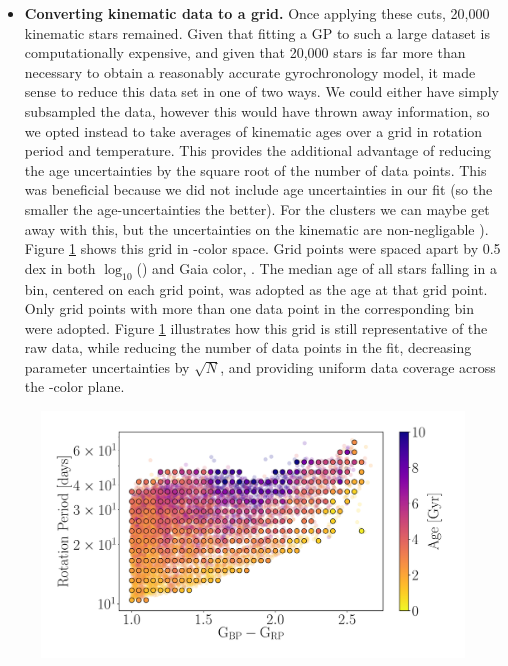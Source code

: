 \begin{itemize}
\item {\bf Converting kinematic data to a grid.}
Once applying these cuts, 20,000 kinematic stars remained.
        Given that fitting a GP to such a large dataset is computationally
        expensive, and given that 20,000 stars is far more than necessary to
        obtain a reasonably accurate gyrochronology model, it made sense to
        reduce this data set in one of two ways.
        We could either have simply subsampled the data, however this would
        have thrown away
        information, so we opted instead to take averages of kinematic ages
        over a grid in rotation period and temperature.
This provides the additional advantage of reducing the age uncertainties by
        the square root of the number of data points.
        This was beneficial because we did not include age uncertainties in
        our fit (so the smaller the age-uncertainties the better).
For the clusters we can maybe get away with this, but the uncertainties on the
kinematic are non-negligable \citep[likely 1-2 Gyr][]{lu2021}).
Figure \ref{fig:grid_points} shows this grid in \prot-color space.
        Grid points were spaced apart by 0.5 dex in both $\log_{10}$(\prot)
        and Gaia color, \gcolor.
The median age of all stars falling in a bin, centered on each grid point, was
adopted as the age at that grid point.
Only grid points with more than one data point in the corresponding bin were
adopted.
Figure \ref{fig:grid_points} illustrates how this grid is still representative
of the raw data, while reducing the number of data points in the fit,
decreasing parameter uncertainties by $\sqrt N$, and providing uniform data
coverage across the \prot-color plane.
\end{itemize}

\begin{figure}
\caption{
}
  \centering \includegraphics[width=1\textwidth]{grid_points}
    \label{fig:grid_points}
\end{figure}

